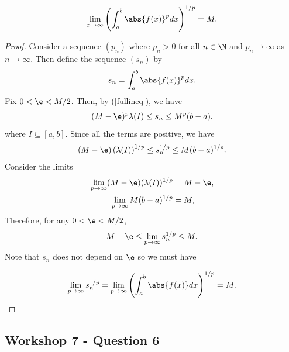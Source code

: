 \documentclass{article}
\begin{document}
\begin{claim*}
   \begin{align*}
      \lim_{p\to\infty} \left(\int_a^b \abs{f(x)}^p dx\right)^{1/p} = M.
   \end{align*}
\end{claim*}
\begin{proof}
   Consider a sequence $(p_n)$ where $p_n>0$ for all $n\in\N$ and 
   $p_n\to\infty$ as $n\to\infty$. Then define the sequence $(s_n)$ by
   \begin{align*}
      s_n = \int_a^b \abs{f(x)}^pdx. 
   \end{align*}
   Fix $0<\e<M/2$. Then, by (\ref{fullineq}), we have 
   \begin{align*}
      (M-\e)^p\lambda(I) \leq s_n \leq M^p(b-a).
   \end{align*}
   where $I\subseteq [a,b]$. Since all the terms are positive, we have
   \begin{align*}
      (M-\e)\left(\lambda(I)\right)^{1/p} \leq 
      s_n^{1/p} \leq 
      M(b-a)^{1/p}.
   \end{align*}
   Consider the limits
   \begin{align*}
      \lim_{p\to\infty} (M-\e)(\lambda(I))^{1/p} &= M-\e,\\
      \lim_{p\to\infty} M(b-a)^{1/p} &= M,\\
   \end{align*}
   Therefore, for any $0<\e<M/2$, 
   \begin{align*}
      M-\e \leq \lim_{p\to\infty} s_n^{1/p} \leq M.
   \end{align*}
   Note that $s_n$ does not depend on $\e$ so we must have 

   \begin{align*}
      \lim_{p\to\infty} s_n^{1/p} = \lim_{p\to\infty} \left(\int_a^b \abs{f(x)}dx\right)^{1/p} = M.
   \end{align*}
\end{proof}

\subsection*{Workshop 7 - Question 6}
\end{document}
